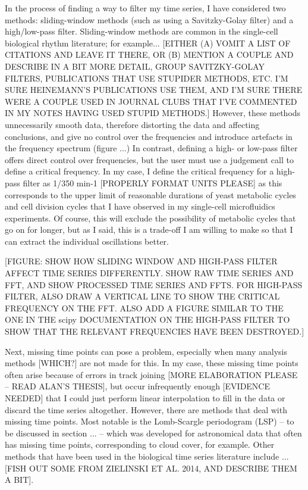 In the process of finding a way to filter my time series, I have considered two methods: sliding-window methods (such as using a Savitzky-Golay filter) and a high/low-pass filter.
Sliding-window methods are common in the single-cell biological rhythm literature; for example... [EITHER (A) VOMIT A LIST OF CITATIONS AND LEAVE IT THERE, OR (B) MENTION A COUPLE AND DESCRIBE IN A BIT MORE DETAIL, GROUP SAVITZKY-GOLAY FILTERS, PUBLICATIONS THAT USE STUPIDER METHODS, ETC.  I'M SURE HEINEMANN'S PUBLICATIONS USE THEM, AND I'M SURE THERE WERE A COUPLE USED IN JOURNAL CLUBS THAT I'VE COMMENTED IN MY NOTES HAVING USED STUPID METHODS.]
However, these methods unnecessarily smooth data, therefore distorting the data and affecting conclusions, and give no control over the frequencies and introduce artefacts in the frequency spectrum (figure ...)
In contrast, defining a high- or low-pass filter offers direct control over frequencies, but the user must use a judgement call to define a critical frequency.
In my case, I define the critical frequency for a high-pass filter as 1/350 min-1 [PROPERLY FORMAT UNITS PLEASE] as this corresponds to the upper limit of reasonable durations of yeast metabolic cycles and cell division cycles that I have observed in my single-cell microfluidics experiments.
Of course, this will exclude the possibility of metabolic cycles that go on for longer, but as I said, this is a trade-off I am willing to make so that I can extract the individual oscillations better.

[FIGURE: SHOW HOW SLIDING WINDOW AND HIGH-PASS FILTER AFFECT TIME SERIES DIFFERENTLY.  SHOW RAW TIME SERIES AND FFT, AND SHOW PROCESSED TIME SERIES AND FFTS.  FOR HIGH-PASS FILTER, ALSO DRAW A VERTICAL LINE TO SHOW THE CRITICAL FREQUENCY ON THE FFT.  ALSO ADD A FIGURE SIMILAR TO THE ONE IN THE scipy DOCUMENTATION ON THE HIGH-PASS FILTER TO SHOW THAT THE RELEVANT FREQUENCIES HAVE BEEN DESTROYED.]

Next, missing time points can pose a problem, especially when many analysis methods [WHICH?] are not made for this.
In my case, these missing time points often arise because of errors in track joining [MORE ELABORATION PLEASE -- READ ALAN'S THESIS], but occur infrequently enough [EVIDENCE NEEDED] that I could just perform linear interpolation to fill in the data or discard the time series altogether.
However, there are methods that deal with missing time points.
Most notable is the Lomb-Scargle periodogram (LSP) -- to be discussed in section ... -- which was developed for astronomical data that often has missing time points, corresponding to cloud cover, for example.
Other methods that have been used in the biological time series literature include ... [FISH OUT SOME FROM ZIELINSKI ET AL. 2014, AND DESCRIBE THEM A BIT].

